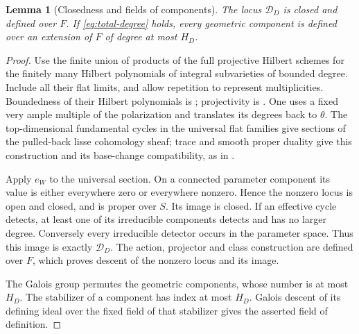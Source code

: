 \documentclass[11pt]{article}
\newtheorem{lemma}[theorem]{Lemma}
\theoremstyle{definition}
\theoremstyle{remark}
\begin{document}
\begin{lemma}[Closedness and fields of components]\label{lem:closed}
The locus $\mathcal D_D$ is closed and defined over $F$. If
\eqref{eq:total-degree} holds, every geometric component is
defined over an extension of $F$ of degree at most $H_D$.
\end{lemma}
\begin{proof}
Use the finite union of products of the full projective Hilbert
schemes for the finitely many Hilbert polynomials of integral
subvarieties of bounded degree. Include all their flat limits, and
allow repetition to represent multiplicities. Boundedness of their Hilbert polynomials is
\cite[Expos\'e~XIII, Corollary~6.11, pp.~658--660]{SGA6};
projectivity is \cite[Expos\'e~221, Theorem~3.2, p.~260]{FGA}. One uses a fixed very ample multiple of the
polarization and translates its degrees back to $\theta$.
The top-dimensional fundamental cycles in the universal flat
families give sections of the pulled-back lisse cohomology sheaf;
trace and smooth proper duality give this construction and its
base-change compatibility, as in \cite[Cycle, \S2.3]{SGA45}.

Apply $e_W$ to the universal section. On a connected parameter
component its value is either everywhere zero or everywhere
nonzero. Hence the nonzero locus is open and closed, and is
proper over $S$. Its image is closed. If an effective cycle detects, at least one of its irreducible
components detects and has no larger degree. Conversely every
irreducible detector occurs in the parameter space. Thus this
image is exactly $\mathcal D_D$. The action, projector
and class construction are defined over $F$, which proves
descent of the nonzero locus and its image.

The Galois group permutes the geometric components, whose number
is at most $H_D$. The stabilizer of a component has index at most
$H_D$. Galois descent of its defining ideal over the fixed field
of that stabilizer gives the asserted field of definition.
\end{proof}
\end{document}
